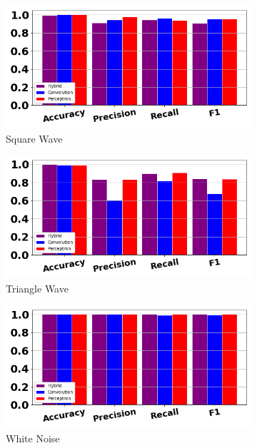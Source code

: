 \documentclass[12pt,letterpaper]{article}
\begin{document}
\begin{figure}[H]
	\begin{subfigure}[b]{0.45\textwidth}
	\centering
	\includegraphics[width=\textwidth]{../FiguresClasses/SquareWave}
	\caption{Square Wave}
	\end{subfigure}	
	\hfill
	\begin{subfigure}[b]{0.45\textwidth}
	\centering
	\includegraphics[width=\textwidth]{../FiguresClasses/TriangleWave}
	\caption{Triangle Wave}
	\end{subfigure}	
	
	\begin{subfigure}[b]{0.45\textwidth}
	\centering
	\includegraphics[width=\textwidth]{../FiguresClasses/WhiteNoise}
	\caption{White Noise}
	\end{subfigure}	


\caption{}
\label{fig-SynthScores}
\end{figure}
\end{document}
